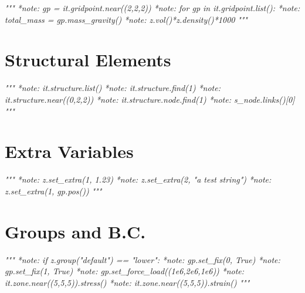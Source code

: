 \documentclass[a4paper, nobind]{templates/ociamthesis}
\newenvironment{Shaded}{\begin{snugshade}}{\end{snugshade}}
\newcommand{\CommentTok}[1]{\textcolor[rgb]{0.56,0.35,0.01}{\textit{#1}}}
\renewenvironment{Shaded}
{
  \vspace{10pt}%
  \begin{snugshade}%
}{%
  \end{snugshade}%
  \vspace{8pt}%
}
\begin{document}
\begin{Shaded}
\begin{Highlighting}[]
\CommentTok{"""}
\CommentTok{*note: gp = it.gridpoint.near((2,2,2))}
\CommentTok{*note: for gp in it.gridpoint.list():}
\CommentTok{*note: total\_mass = gp.mass\_gravity()}
\CommentTok{*note: z.vol()*z.density()*1000}
\CommentTok{"""}
\end{Highlighting}
\end{Shaded}

\hypertarget{structural-elements}{%
\section{Structural Elements}\label{structural-elements}}

\begin{Shaded}
\begin{Highlighting}[]
\CommentTok{"""}
\CommentTok{*note: it.structure.list()}
\CommentTok{*note: it.structure.find(1)}
\CommentTok{*note: it.structure.near((0,2,2))}
\CommentTok{*note: it.structure.node.find(1)}
\CommentTok{*note: s\_node.links()[0]}
\CommentTok{"""}
\end{Highlighting}
\end{Shaded}

\hypertarget{extra-variables}{%
\section{Extra Variables}\label{extra-variables}}

\begin{Shaded}
\begin{Highlighting}[]
\CommentTok{"""}
\CommentTok{*note: z.set\_extra(1, 1.23)}
\CommentTok{*note: z.set\_extra(2, "a test string")}
\CommentTok{*note: z.set\_extra(1, gp.pos())}
\CommentTok{"""}
\end{Highlighting}
\end{Shaded}

\hypertarget{groups-and-b.c.}{%
\section{Groups and B.C.}\label{groups-and-b.c.}}

\begin{Shaded}
\begin{Highlighting}[]
\CommentTok{"""}
\CommentTok{*note: if z.group("default") == "lower":}
\CommentTok{*note: gp.set\_fix(0, True)}
\CommentTok{*note: gp.set\_fix(1, True)}
\CommentTok{*note: gp.set\_force\_load((1e6,2e6,1e6))}
\CommentTok{*note: it.zone.near((5,5,5)).stress()}
\CommentTok{*note: it.zone.near((5,5,5)).strain()}
\CommentTok{"""}
\end{Highlighting}
\end{Shaded}
\end{document}
